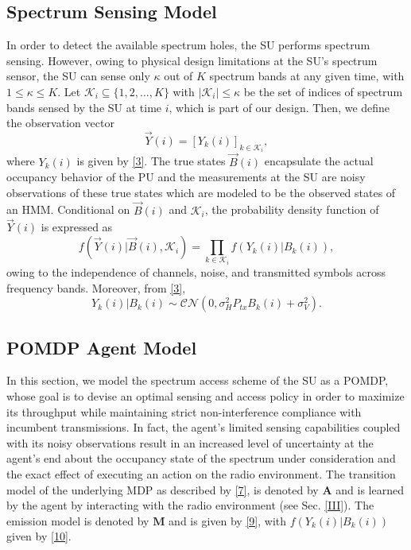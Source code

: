 \documentclass[10pt,twocolumn]{IEEEtran}
\begin{document}
\subsection{Spectrum Sensing Model}
In order to detect the available spectrum holes, the SU performs spectrum sensing. However, owing to physical design limitations at the SU's spectrum sensor, the SU can sense only $\kappa$ out of $K$ spectrum bands at any given time, with $1{\leq}\kappa{\leq}K$. Let $\mathcal K_{i}{\subseteq}\{1,2,\dots,K\}$ with $|\mathcal K_i|{\leq}\kappa$ be the set of indices of spectrum bands sensed by the SU at time $i$, which is part of our design.
Then, we define the observation vector
\begin{equation}\label{8}
    \vec{Y}(i) = [Y_k(i)]_{k {\in} \mathcal K_i},
\end{equation}
where $Y_k(i)$ is given by \eqref{3}.
The true states $\vec{B}(i)$ encapsulate the actual occupancy behavior of the PU and the measurements at the SU are noisy observations of these true states which are modeled to be the observed states of an HMM. 
Conditional on $\vec{B}(i)$ and $\mathcal K_i$, the probability density function of $\vec{Y}(i)$ is expressed as
\begin{equation}\label{9}
    f(\vec{Y}(i)|\vec{B}(i), \mathcal K_i) = \prod_{k \in \mathcal K_i} f(Y_k(i)|B_k(i)),
\end{equation}
owing to the independence of channels, noise, and transmitted symbols across frequency bands. Moreover, from \eqref{3},
\begin{equation}\label{10}
 Y_k(i)|B_k(i) \sim \mathcal{CN}(0, \sigma_H^2P_{tx}B_k(i) + \sigma_V^2).
\end{equation}
\subsection{POMDP Agent Model}
In this section, we model the spectrum access scheme of the SU as a POMDP, whose goal is to devise an optimal sensing and access policy in order to maximize its throughput while maintaining strict non-interference compliance with incumbent transmissions. In fact, the agent's limited sensing capabilities coupled with its noisy observations result in an increased level of uncertainty at the agent's end about the occupancy state of the spectrum under consideration and the exact effect of executing an action on the radio environment. The transition model of the underlying MDP as described by \eqref{7}, is denoted by $\mathbf{A}$ and is learned by the agent by interacting with the radio environment (see Sec. \ref{III}). The emission model is denoted by $\mathbf{M}$ and is given by \eqref{9}, with $f(Y_k(i)|B_k(i))$ given by \eqref{10}. 
\end{document}
